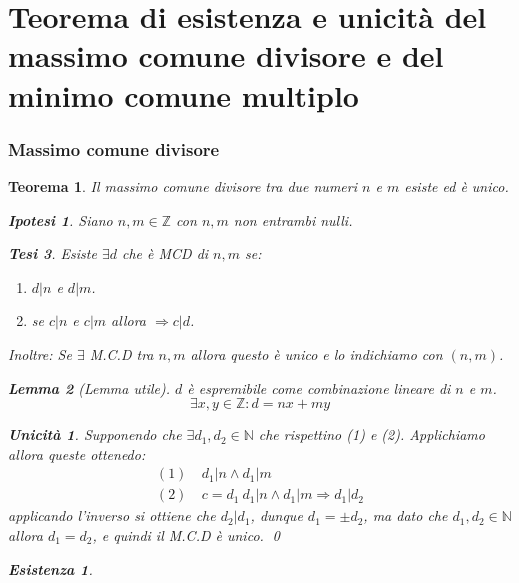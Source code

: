 \documentclass{article}
\makeatletter
\renewenvironment{proof}[1][\proofname]{\par
    \pushQED{\qed}%
    \normalfont \topsep6\p@\@plus6\p@\relax
    \trivlist
    \item\relax
    {\itshape
    #1\@addpunct{.}}\hspace\labelsep\ignorespaces
    }{%
    \popQED\endtrivlist\@endpefalse
}
\newtheorem{theorem}{Teorema}[part]
\newtheorem{lemma}{Lemma}[theorem]
\newtheorem{ipothesis}[lemma]{Ipotesi}
\newtheorem{thesis}[lemma]{Tesi}
\theoremstyle{definition}
\newtheorem*{existence}{Esistenza}
\newtheorem*{uniqueness}{Unicità}
\makeatother
\begin{document}
\part[Esistenza e unicità di MCD e MCM]{Teorema di esistenza e unicità del massimo comune divisore e del minimo comune multiplo}
\section[Massimo comune divisore (MCD)]{Massimo comune divisore}
\begin{theorem}
    Il massimo comune divisore tra due numeri \(n\) e \(m\) esiste ed è unico.
    \begin{ipothesis}
        Siano \(n,m\in\mathbb{Z}\) con \(n,m\) non entrambi nulli.
    \end{ipothesis}
    \begin{thesis}
        Esiste \(\exists d\) che è MCD di \(n,m\) se:
        \begin{enumerate}
            \item \(d|n\) e \(d|m\).
            \item se \(c|n\) e \(c|m\) allora \(\Rightarrow c|d\).
        \end{enumerate} 
        Inoltre: Se \(\exists\) M.C.D tra \(n,m\) allora questo è unico e lo indichiamo con \((n,m)\).
        \begin{lemma}[Lemma utile]
            \(d\) è espremibile come combinazione lineare di \(n\) e \(m\).
            \[
                \exists x,y\in\mathbb{Z}: d=nx+my
            \]
        \end{lemma}
    \end{thesis}
    \begin{proof}
        \begin{uniqueness}
            Supponendo che \(\exists d_1,d_2\in\mathbb{N}\) che rispettino (1) e (2). Applichiamo allora queste ottenedo:
            \[
                \begin{aligned}
                    (1)&\ d_1|n \wedge d_1|m\\
                    (2)&\ c=d_1\ d_1|n \wedge d_1|m \Rightarrow d_1|d_2
                \end{aligned}
            \]
            applicando l'inverso si ottiene che \(d_2|d_1\), dunque \(d_1=\pm d_2\), ma dato che \(d_1,d_2\in\mathbb{N}\) allora \(d_1=d_2\), e quindi il M.C.D è unico.
            \qed
        \end{uniqueness}
        \begin{existence}

\end{existence}
\end{proof}
\end{theorem}
\end{document}
